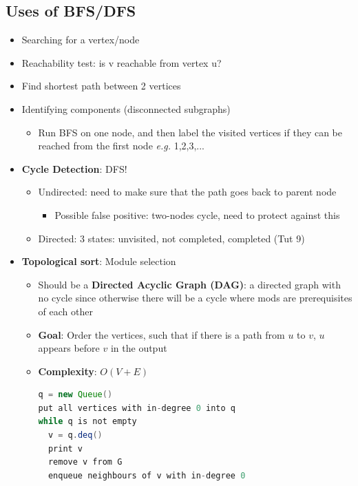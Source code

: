 \documentclass{article}
\newcommand{\eg}[0]{\textit{e.g. }}
\begin{document}
\begin{multicols}{2}
\subsection{Uses of BFS/DFS}
\begin{itemize}
	\item Searching for a vertex/node
	\item Reachability test: is v reachable from vertex u?
	\item Find shortest path between 2 vertices
	\item Identifying components (disconnected subgraphs)
	\begin{itemize}
		\item Run BFS on one node, and then label the visited vertices if they can be reached from the first node \eg 1,2,3,...
	\end{itemize}
    \item \textbf{Cycle Detection}: DFS!
    \begin{itemize}
    	\item Undirected: need to make sure that the path goes back to parent node
    	\begin{itemize}
    		\item Possible false positive: two-nodes cycle, need to protect against this
    	\end{itemize}
        \item Directed: 3 states: unvisited, not completed, completed (Tut 9)
    \end{itemize}
	\item \textbf{Topological sort}: Module selection
	\begin{itemize}
		\item Should be a \textbf{Directed Acyclic Graph (DAG)}: a directed graph with no cycle since otherwise there will be a cycle where mods are prerequisites of each other
		\item \textbf{Goal}: Order the vertices, such that if there is a path from $u$ to $v$, $u$ appears before $v$ in the output
		\item \textbf{Complexity}: $O(V+E)$
		\begin{lstlisting}[language=Java]
q = new Queue()
put all vertices with in-degree 0 into q
while q is not empty
  v = q.deq()
  print v
  remove v from G
  enqueue neighbours of v with in-degree 0\end{lstlisting}
	\end{itemize}
\end{itemize}


\end{multicols}
\end{document}
